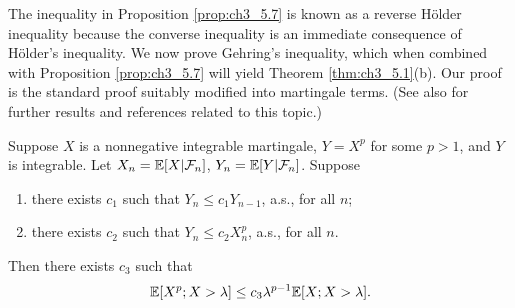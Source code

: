 
The inequality in Proposition \ref{prop:ch3_5.7} is known as a reverse H\"older inequality because the converse inequality is an immediate consequence of H\"older's inequality. We now prove Gehring's inequality, which when combined with Proposition \ref{prop:ch3_5.7} will yield Theorem \ref{thm:ch3_5.1}(b). Our proof is the standard proof suitably modified into martingale terms. (See also \cite{DoleansDadeMeyer1979} for further results and references related to this topic.)

\begin{lemma}\label{lem:ch3_5.8}
Suppose $X$ is a nonnegative integrable martingale, $Y = X^p$ for some $p > 1$, and $Y$ is integrable. Let $X_n = \mathbb{E}[X| \mathcal{F}_n]$, $Y_n = \mathbb{E}[Y| \mathcal{F}_n]$. Suppose
\begin{enumerate}
    \item there exists $c_1$ such that $Y_n \leq c_1Y_{n-1}$, a.s., for all $n$;
    \item there exists $c_2$ such that $Y_n \leq c_2X_n^p$, a.s., for all $n$.
\end{enumerate}

Then there exists $c_3$ such that
\begin{equation}\label{eq:ch3_5.16}
    \mathbb{E}[X^p; X > \lambda] \leq c_3\lambda^{p-1}\mathbb{E}[X; X > \lambda].
\end{equation}
\end{lemma}

